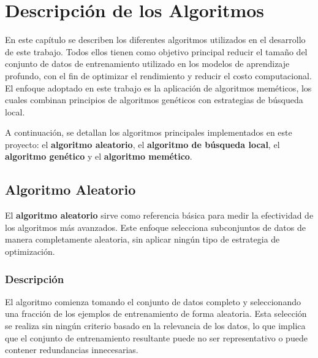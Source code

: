 
\chapter{Descripción de los Algoritmos}\label{ch:descripcion-algoritmos}
En este capítulo se describen los diferentes algoritmos utilizados en el desarrollo de este trabajo.
Todos ellos tienen como objetivo principal reducir el tamaño del conjunto de datos de entrenamiento utilizado en los
modelos de aprendizaje profundo, con el fin de optimizar el rendimiento y reducir el costo computacional.
El enfoque adoptado en este trabajo es la aplicación de algoritmos meméticos, los cuales combinan principios de
algoritmos genéticos con estrategias de búsqueda local.


A continuación, se detallan los algoritmos principales implementados en este proyecto: el \textbf{algoritmo aleatorio},
el \textbf{algoritmo de búsqueda local}, el \textbf{algoritmo genético} y el \textbf{algoritmo memético}.

\section{Algoritmo Aleatorio}\label{sec:algoritmo-aleatorio}
El \textbf{algoritmo aleatorio} sirve como referencia básica para medir la efectividad de los algoritmos más avanzados.
Este enfoque selecciona subconjuntos de datos de manera completamente aleatoria, sin aplicar ningún tipo de estrategia
de optimización.

\subsection{Descripción}\label{subsec:descripcion-aleatorio}
El algoritmo comienza tomando el conjunto de datos completo y seleccionando una fracción de los ejemplos de
entrenamiento de forma aleatoria.
Esta selección se realiza sin ningún criterio basado en la relevancia de los datos, lo que implica que el conjunto de
entrenamiento resultante puede no ser representativo o puede contener redundancias innecesarias.

